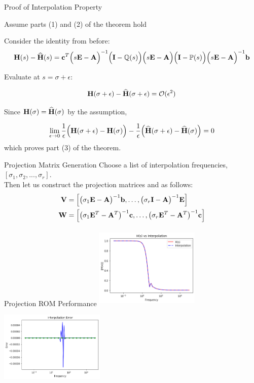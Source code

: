 \begin{frame}{Proof of Interpolation Property}

Assume parts (1) and (2) of the theorem hold\\

\bigskip

Consider the identity from before:
$$
    {\bf H}(s) -{\bf \widehat{H}}(s) = 
    {\bf c}^T \Big( s{\bf E-A} \Big)^{-1} \Big( {\bf I} - \mathbb{Q}(s) \Big) \Big( s{\bf E-A} \Big) \Big( {\bf I} - \mathbb{P}(s) \Big) \Big( s{\bf E-A} \Big)^{-1} {\bf b}
$$

Evaluate at $s = \sigma + \epsilon$:

$${\bf H}(\sigma + \epsilon) -{\bf \widehat{H}}(\sigma + \epsilon) = \mathcal{O}(\epsilon^2)$$

Since ${\bf H}(\sigma) = {\bf \widehat H}(\sigma)$ by the assumption,

$$\lim_{\epsilon \to 0} \frac{1}{\epsilon}\Big({\bf H}(\sigma + \epsilon) - {\bf H}(\sigma)\Big) - \frac{1}{\epsilon}\Big({\bf \widehat H}(\sigma + \epsilon) - {\bf \widehat H}(\sigma)\Big) = 0$$
which proves part (3) of the theorem.
\end{frame}
\begin{frame}{Projection Matrix Generation}
Choose a list of interpolation frequencies, \([\sigma_1,\sigma_2, ... , \sigma_r]\).\\
\bigskip
Then let us construct the projection matrices and as follows:
\begin{align*}
    {\bf V} & = \Big[ \big( \sigma_1{\bf E}-{\bf A} \big)^{-1}{\bf b}, \dots, \big( \sigma_r{\bf I}-{\bf A} \big)^{-1}{\bf E} \Big] \\
    {\bf W} & = \Big[ \big( \sigma_1{\bf E}^T-{\bf A}^T \big)^{-1} {\bf c}, \dots, \big( \sigma_r{\bf E}^T-{\bf A}^T \big)^{-1} {\bf c} \Big] \\ 
\end{align*}
\end{frame}
\begin{frame}{Projection ROM Performance}
\centering
\includegraphics[width=5cm, height= 4cm]{1D_proj.png}
\bigskip
\includegraphics[width=5cm, height=4cm]{1D_proj_err.png}
    
\end{frame}
